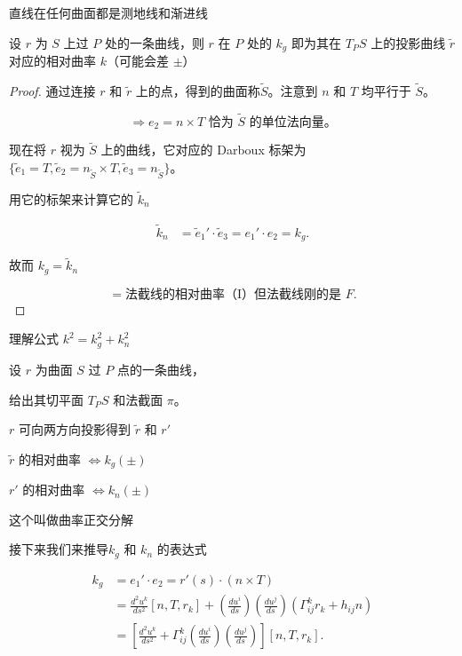 \documentclass[lang=cn,10pt,thmcnt=section]{elegantbook}
\begin{document}
\begin{corollary}
    直线在任何曲面都是测地线和渐进线
\end{corollary}
\begin{proposition}
    设 $r$ 为 $S$ 上过 $P$ 处的一条曲线，则 $r$ 在 $P$ 处的 $k_g$ 即为其在 $T_P S$ 上的投影曲线 $\tilde{r}$ 对应的相对曲率 $k$（可能会差 $\pm$）
\end{proposition}
\begin{proof}
    通过连接 $r$ 和 $\tilde{r}$ 上的点，得到的曲面称$\tilde{S}$。注意到 $n$ 和 $T$ 均平行于 $\tilde{S}$。

\[
\Rightarrow e_2 = n \times T \text{ 恰为 } \tilde{S} \text{ 的单位法向量。}
\]

现在将 $r$ 视为 $\tilde{S}$ 上的曲线，它对应的 Darboux 标架为 $\{\tilde{e}_1 = T, \tilde{e}_2 = n_{\tilde{S}} \times T, \tilde{e}_3 = n_{\tilde{S}}\}$。

用它的标架来计算它的 $\tilde{k}_n$

\[
\begin{aligned}
    \tilde{k}_n &= \tilde{e}_1' \cdot \tilde{e}_3 = e_1' \cdot e_2 = k_g.
\end{aligned}
\]

故而 $k_g = \tilde{k}_n$

\[
= \text{法截线的相对曲率（I）但法截线刚的是 } F.
\]

\end{proof}

理解公式 $k^2 = k_g^2 + k_n^2$

设 $r$ 为曲面 $S$ 过 $P$ 点的一条曲线，

给出其切平面 $T_P S$ 和法截面 $\pi$。

$r$ 可向两方向投影得到 $\tilde{r}$ 和 $r'$

$\tilde{r}$ 的相对曲率 $\Leftrightarrow k_g (\pm)$

$r'$ 的相对曲率 $\Leftrightarrow k_n (\pm)$

这个叫做曲率正交分解


接下来我们来推导$k_g$ 和 $k_n$ 的表达式

\begin{align*}
    k_g &= e_1' \cdot e_2 = r'(s) \cdot (n \times T) \\
    &= \frac{d^2 u^k}{ds^2} [n, T, r_k] + \left( \frac{du^i}{ds} \right) \left( \frac{du^j}{ds} \right) \left( \Gamma_{ij}^k r_k + h_{ij} n \right) \\
    &= \left[ \frac{d^2 u^k}{ds^2} + \Gamma_{ij}^k \left( \frac{du^i}{ds} \right) \left( \frac{du^j}{ds} \right) \right] [n, T, r_k].
\end{align*}
\end{document}
